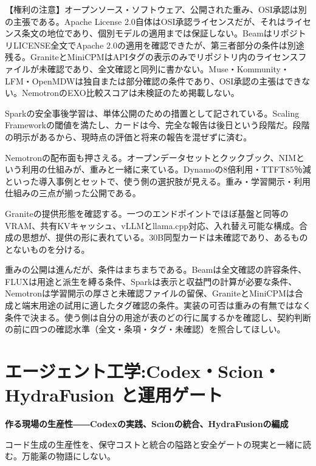 \documentclass[lualatex,a4paper,10pt]{jlreq}
\begin{document}
\begin{tcolorbox}[colback=SurveySoft,colframe=SurveyRule,arc=1mm,boxrule=0.4pt,left=2mm,right=2mm]
【権利の注意】オープンソース・ソフトウェア、公開された重み、OSI承認は別の主張である。Apache License 2.0自体はOSI承認ライセンスだが、それはライセンス条文の地位であり、個別モデルの適用までは保証しない。BeamはリポジトリLICENSE全文でApache 2.0の適用を確認できたが、第三者部分の条件は別途残る。GraniteとMiniCPMはAPIタグの表示のみでリポジトリ内のライセンスファイルが未確認であり、全文確認と同列に書かない。Muse・Kommunity・LFM・OpenMDWは独自または部分確認の条件であり、OSI承認の主張はできない。NemotronのEXO比較スコアは未検証のため掲載しない。
\end{tcolorbox}
\cite{B14,B70,B15,B13,B71,B17,B19,B18,B16,B21,B72,B22,B20,B24,B73,B23,B25,B27,B74,B26,B29,B28,B30}

Sparkの安全事後学習は、単体公開のための措置として記されている。Scaling Frameworkの閾値を満たし、カードは今、完全な報告は後日という段階だ。段階の明示があるから、現時点の評価と将来の報告を混ぜずに済む。
\cite{B14,B70,B15,B13,B71}


Nemotronの配布面も押さえる。オープンデータセットとクックブック、NIMという利用の仕組みが、重みと一緒に来ている。Dynamoの8倍利用・TTFT85％減といった導入事例とセットで、使う側の選択肢が見える。重み・学習開示・利用仕組みの三点が揃った公開である。
\cite{B21,B72,B22,B20}


Graniteの提供形態を確認する。一つのエンドポイントでほぼ基盤と同等のVRAM、共有KVキャッシュ、vLLMとllama.cpp対応、入れ替え可能な構成。合成の思想が、提供の形に表れている。30B同型カードは未確認であり、あるものとないものを分ける。
\cite{B24,B73,B23,B25}


重みの公開は進んだが、条件はまちまちである。Beamは全文確認の許容条件、FLUXは用途と派生を縛る条件、Sparkは表示と収益門の計算が必要な条件、Nemotronは学習開示の厚さと未確認ファイルの留保、GraniteとMiniCPMは合成と端末用途の試用に適したタグ確認の条件。実装の可否は重みの有無ではなく条件で決まる。使う側は自分の用途が表のどの行に属するかを確認し、契約判断の前に四つの確認水準（全文・条項・タグ・未確認）を照合してほしい。
\cite{B14,B70,B15,B13,B71,B17,B19,B18,B16,B21,B72,B22,B20,B24,B73,B23,B25,B27,B74,B26,B29,B28,B30}


\section{エージェント工学:Codex・Scion・HydraFusion と運用ゲート}
\label{sec:P4}

{\Large\bfseries 作る現場の生産性――Codexの実践、Scionの統合、HydraFusionの編成\par}
\smallskip
{\color{SurveyMuted}コード生成の生産性を、保守コストと統合の隘路と安全ゲートの現実と一緒に読む。万能薬の物語にしない。\par}
\bigskip
\end{document}
